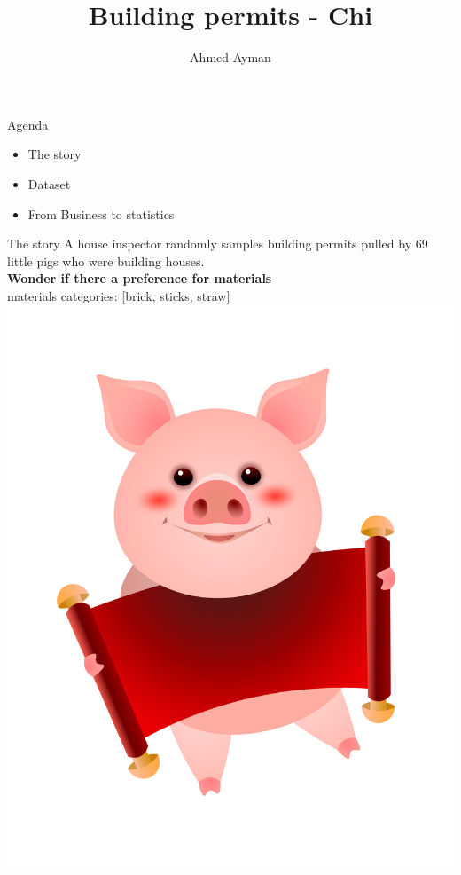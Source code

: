 \documentclass[8pt]{beamer}
\title{Building permits - Chi}
\author{Ahmed Ayman}
\begin{document}
        \maketitle
        \begin{frame}{Agenda}
            \begin{itemize}
                \item The story
                \item Dataset
                \item From Business to statistics
            \end{itemize}
        \end{frame}

        \begin{frame}{The story}
            A house inspector randomly samples building permits pulled by  69 little pigs who were building houses.\\
            \textbf{Wonder if there a preference for materials}\\
            materials categories: [brick, sticks, straw]\\
            \centering
            \includegraphics[height=.33\textheight]{images/pig.jpg}

\end{frame}
\end{document}

